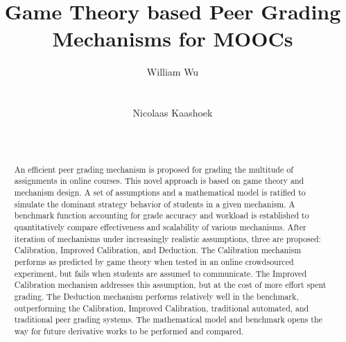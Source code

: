 \documentclass{sigchi}
\begin{document}
\title{Game Theory based Peer Grading Mechanisms for MOOCs}

\author{
  \alignauthor William Wu\\
    \\
    \\
  \alignauthor Nicolaas Kaashoek\\
    \\
    \\
}

\maketitle

\begin{abstract}
An efficient peer grading mechanism is proposed for grading the multitude of assignments in online courses. This novel approach is based on game theory and mechanism design. A set of assumptions and a mathematical model is ratified to simulate the dominant strategy behavior of students in a given mechanism. A benchmark function accounting for grade accuracy and workload is established to quantitatively compare effectiveness and scalability of various mechanisms. After iteration of mechanisms under increasingly realistic assumptions, three are proposed: Calibration, Improved Calibration, and Deduction. The Calibration mechanism performs as predicted by game theory when tested in an online crowdsourced experiment, but fails when students are assumed to communicate. The Improved Calibration mechanism addresses this assumption, but at the cost of more effort spent grading. The Deduction mechanism performs relatively well in the benchmark, outperforming the Calibration, Improved Calibration, traditional automated, and traditional peer grading systems. The mathematical model and benchmark opens the way for future derivative works to be performed and compared.
\end{abstract}


\end{document}

